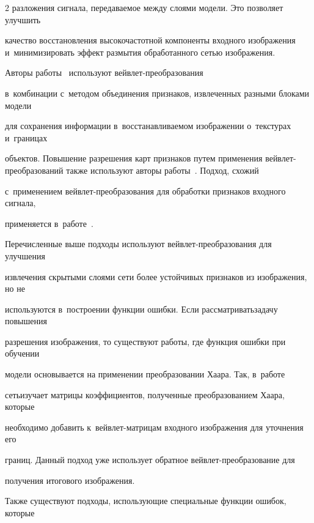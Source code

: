\begin{multicols}{2}
разложения сигнала, передаваемое между слоями модели. Это позволяет улучшить 


качество восстановления высокочастотной компоненты входного изображения и~минимизировать эффект размытия обработанного сетью изображения.





Авторы работы~\cite{WaveletPooling} используют вейв\-лет-пре\-обра\-зо\-ва\-ния 


в~комбинации с~методом объединения признаков, извлеченных разными блоками модели 


для сохранения информации в~восстанавливаемом изоб\-ра\-же\-нии о~текстурах и~границах 


объектов. Повышение разрешения карт признаков путем применения вейв\-лет-пре\-обра\-зо\-ва\-ний также используют авторы работы~\cite{MDIWT}. Подход, схожий 


с~применением вейв\-лет-пре\-обра\-зо\-ва\-ния для обработки признаков входного сигнала, 


применяется в~работе~\cite{WINNet}.





Перечисленные выше подходы используют вейв\-лет-пре\-обра\-зо\-ва\-ния для улучшения 


извлечения скрытыми слоями сети более устойчивых признаков из изображения, но не 


используются в~построении функции ошибки. Если рассматривать\linebreak задачу повышения 


разрешения изображения, то существуют работы, где функция ошибки при обуче\-нии 


модели основывается на применении преобразовании Хаара. Так, в~работе~\cite{DWB} 


сеть\linebreak изучает \mbox{матрицы} коэффициентов, полученные преобразованием Хаара, которые 


необходимо добавить к~вейв\-лет-мат\-ри\-цам входного изображения для уточнения его 


границ. Данный подход уже использует обратное вейв\-лет-пре\-обра\-зо\-ва\-ние для 


получения итогового изображения.





Также существуют подходы, использующие специальные функции ошибок, которые 



\end{multicols}
